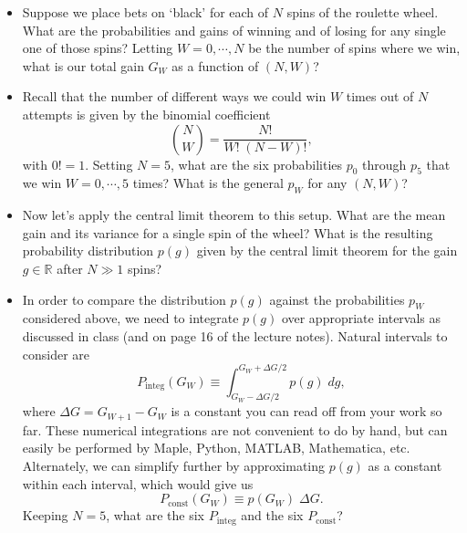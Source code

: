 \documentclass[12 pt]{article} %
\newcommand{\Rbb}{\ensuremath{\mathbb R} }
\newcommand{\De}{\ensuremath{\Delta} }
\begin{document}
\begin{itemize}
  \item Suppose we place  bets on `black' for each of $N$ spins of the roulette wheel.
        What are the probabilities and gains of winning and of losing for any single one of those spins?
        Letting $W = 0, \cdots, N$ be the number of spins where we win, what is our total gain $G_W$ as a function of $(N, W)$? \\[30 pt]
  \item Recall that the number of different ways we could win $W$ times out of $N$ attempts is given by the binomial coefficient
        \begin{equation*}
          \binom{N}{W} = \frac{N!}{W! \; (N - W)!},
        \end{equation*}
        with $0! = 1$.
        Setting $N = 5$, what are the six probabilities $p_0$ through $p_5$ that we win $W = 0, \cdots, 5$ times?
        What is the general $p_W$ for any $(N, W)$? \\[30 pt]
  \item Now let's apply the central limit theorem to this setup.
        What are the mean gain and its variance for a single spin of the wheel?
        What is the resulting probability distribution $p(g)$ given by the central limit theorem for the gain $g \in \Rbb$ after $N \gg 1$ spins?
        \newpage
  \item In order to compare the distribution $p(g)$ against the probabilities $p_W$ considered above, we need to integrate $p(g)$ over appropriate intervals as discussed in class (and on page 16 of the lecture notes).
        Natural intervals to consider are
        \begin{equation*}
          P_{\text{integ}}(G_W) \equiv \int_{G_W - \De G / 2}^{G_W + \De G / 2} p(g) \; dg,
        \end{equation*}
        where $\De G = G_{W + 1} - G_W$ is a constant you can read off from your work so far.
        These numerical integrations are not convenient to do by hand, but can easily be performed by Maple, Python, MATLAB, Mathematica, etc.
        Alternately, we can simplify further by approximating $p(g)$ as a constant within each interval, which would give us
        \begin{equation*}
          P_{\text{const}}(G_W) \equiv p(G_W) \; \De G.
        \end{equation*}
        Keeping $N = 5$, what are the six $P_{\text{integ}}$ and the six $P_{\text{const}}$?
\end{itemize}
\end{document}

